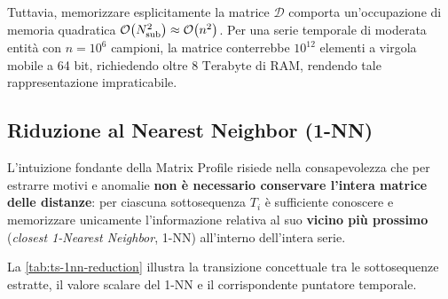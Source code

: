 Tuttavia, memorizzare esplicitamente la matrice $\mathcal{D}$ comporta un'occupazione di memoria quadratica $\mathcal{O}\!\left(N_{\text{sub}}^2\right) \approx \mathcal{O}\!\left(n^2\right)$. Per una serie temporale di moderata entit\`a con $n = 10^6$ campioni, la matrice conterrebbe $10^{12}$ elementi a virgola mobile a 64 bit, richiedendo oltre $8\text{ Terabyte}$ di RAM, rendendo tale rappresentazione impraticabile.

\FloatBarrier
\subsection{Riduzione al Nearest Neighbor (1-NN)}
\label{subsec:ts-1nn-reduction}

L'intuizione fondante della Matrix Profile risiede nella consapevolezza che per estrarre motivi e anomalie \textbf{non \`e necessario conservare l'intera matrice delle distanze}: per ciascuna sottosequenza $T_i$ \`e sufficiente conoscere e memorizzare unicamente l'informazione relativa al suo \textbf{vicino pi\`u prossimo} (\textit{closest 1-Nearest Neighbor}, 1-NN) all'interno dell'intera serie.

La \autoref{tab:ts-1nn-reduction} illustra la transizione concettuale tra le sottosequenze estratte, il valore scalare del 1-NN e il corrispondente puntatore temporale.

\begin{table}[H]
\centering
\caption{Processo di riduzione al 1-Nearest Neighbor (Slide~7): mappatura tra le sottosequenze estratte, la relativa distanza minima e il rispettivo vicino pi\`u affine.}
\label{tab:ts-1nn-reduction}
\vspace{2mm}
\end{table}

